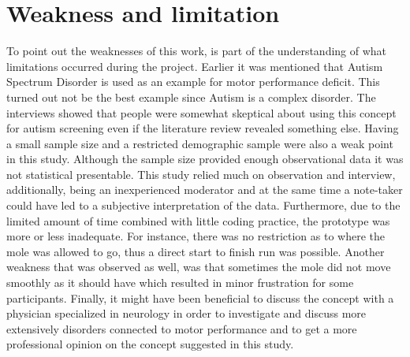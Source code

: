 \section{Weakness and limitation}


To point out the weaknesses of this work, is part of the understanding of what limitations occurred during the project.
Earlier it was mentioned that Autism Spectrum Disorder is used as an example for motor performance deficit. This turned out not be the best example since Autism is a complex disorder. The interviews showed that people were somewhat skeptical about using this concept for autism screening even if the literature review revealed something else. Having a small sample size and a restricted demographic sample were also a weak point in this study. Although the sample size provided enough observational data it was not statistical presentable. This study relied much on observation and interview, additionally, being an inexperienced moderator and at the same time a note-taker could have led to a subjective interpretation of the data. Furthermore, due to the limited amount of time combined with little coding practice, the prototype was more or less inadequate. For instance, there was no restriction as to where the mole was allowed to go, thus a direct start to finish run was possible. Another weakness that was observed as well, was that sometimes the mole did not move smoothly as it should have which resulted in minor frustration for some participants.
Finally, it might have been beneficial to discuss the concept with a physician specialized in neurology in order to investigate and discuss more extensively disorders connected to motor performance and to get a more professional opinion on the concept suggested in this study. 
